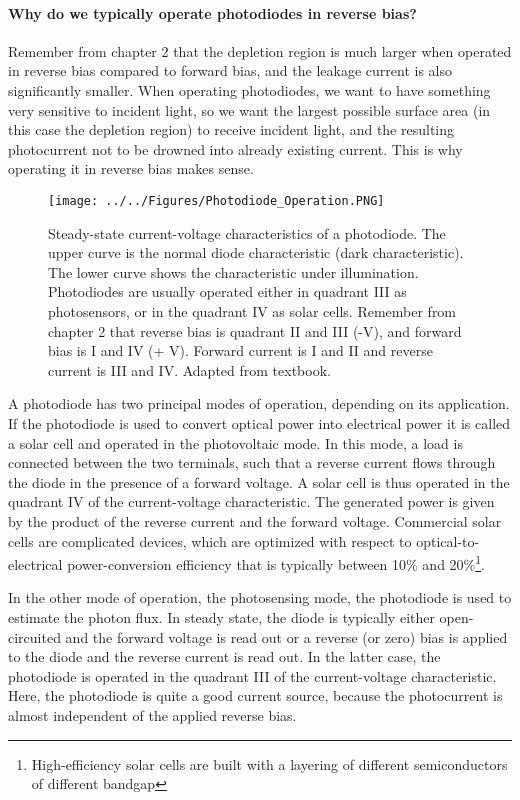 \paragraph{Why do we typically operate photodiodes in reverse bias?} Remember from chapter 2 that the depletion region is much larger when operated in reverse bias compared to forward bias, and the leakage current is also significantly smaller. When operating photodiodes, we want to have something very sensitive to incident light, so we want the largest possible surface area (in this case the depletion region) to receive incident light, and the resulting photocurrent not to be drowned into already existing current. This is why operating it in reverse bias makes sense.

\begin{figure}[H]
    \centering
    \texttt{[image: ../../Figures/Photodiode\_Operation.PNG]}
    \caption{Steady-state current-voltage characteristics of a photodiode. The upper curve is the normal diode characteristic (dark characteristic). The lower curve shows the characteristic under illumination. Photodiodes are usually operated either in quadrant III as photosensors, or in the quadrant IV as solar cells. Remember from chapter 2 that reverse bias is quadrant II and III (-V), and forward bias is I and IV (+ V). Forward current is I and II and reverse current is III and IV. Adapted from textbook.}
    \label{fig:Photodiode_Operation}
\end{figure}

A photodiode has two principal modes of operation, depending on its application. If the photodiode is used to convert optical power into electrical power it is called a solar cell and operated in the photovoltaic mode. In this mode, a load is connected between the two terminals, such that a reverse current flows through the diode in the presence of a forward voltage. A solar cell is thus operated in the quadrant IV of the current-voltage characteristic. The generated power is given by the product of the reverse current and the
forward voltage. Commercial solar cells are complicated devices, which are
optimized with respect to optical-to-electrical power-conversion efficiency that
is typically between 10\% and 20\%\footnote{High-efficiency solar cells are built with a layering of different semiconductors of different bandgap}.

In the other mode of operation, the photosensing mode, the photodiode is used to estimate the photon flux. In steady state, the diode is typically either open-circuited and the forward voltage is read out or a reverse (or zero) bias is applied to the diode and the reverse current is read out. In the latter case, the photodiode is operated in the quadrant III of the current-voltage characteristic. Here, the photodiode is quite a good current source, because the photocurrent is almost independent of the applied reverse bias.

